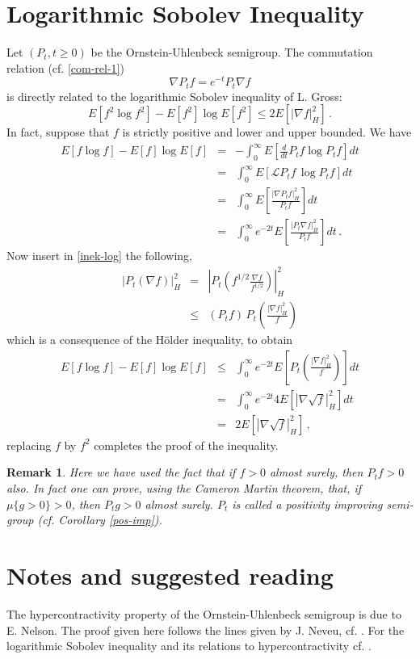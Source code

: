 \documentclass[12pt,a4paper]{book}
\newtheorem{remarkk}[theorem]{Remark}
\newcommand{\bea}{\begin{eqnarray}}
\newcommand{\eea}{\end{eqnarray}}
\newcommand{\beaa}{\begin{eqnarray*}}
\newcommand{\eeaa}{\end{eqnarray*}}
\renewcommand{\L}{{\mathcal L}}
\begin{document}
\section{Logarithmic Sobolev Inequality}
Let $(P_t,t\geq 0)$ be the Ornstein-Uhlenbeck semigroup. The
commutation relation (cf. \ref{com-rel-1}) 
$$
\nabla P_tf=e^{-t}P_t\nabla f
$$
is directly related to the logarithmic Sobolev inequality of L. Gross:
$$
E\left[f^2\log f^2\right]-E[f^2]\log E[f^2]\leq 2E\left[|\nabla
  f|_H^2\right]\,.
$$
In fact, suppose that $f$ is strictly  positive and lower and upper
bounded.  We have
\bea
\label{inek-log}
E[f\log f]-E[f]\log E[f]&=&-\int_0^\infty
 E\left[ \frac{d}{dt}P_tf\log P_tf\right]dt\nonumber\\
&=&\int_0^\infty E\left[\L P_tf\,\log P_tf\right]dt\nonumber\\
&=&\int_0^\infty E\left[\frac{|\nabla P_tf|_H^2}{ P_tf}\right]dt\nonumber\\
&=&\int_0^\infty e^{-2t}E\left[\frac{|P_t\nabla f|_H^2}{P_tf}\right]dt\,.
\eea
Now insert in \ref{inek-log}  the following,
\beaa
|P_t(\nabla f)|_H^2&=&\left|P_t\left(f^{1/2}\frac{\nabla
      f}{f^{1/2}}\right)\right |_H^2\\
&\leq& (P_tf)\,P_t\left(\frac{|\nabla f|_H^2}{f}\right)
\eeaa
which is a consequence of the H\"older  inequality, to obtain
\beaa
E[f\log f]-E[f]\log E[f]&\leq&\int_0^\infty
e^{-2t}E\left[P_t\left(\frac{|\nabla f|_H^2}{f}\right)\right]dt\\
&=&\int_0^\infty e^{-2t}4 E[|\nabla\sqrt{f}|_H^2]dt\\
&=&2E[|\nabla\sqrt{f}|_H^2]\,,
\eeaa
replacing $f$ by $f^2$ completes the proof of the inequality.

\begin{remarkk}{\rm
Here we have used the fact that if $f>0$ almost surely, then $P_tf>0$
also. In fact one can prove, using the Cameron Martin theorem, that, if
$\mu\{g>0\}>0$, then $P_tg>0$ almost surely. $P_t$ is called a
 positivity improving semi-group (cf. Corollary \ref{pos-imp}).
}
\end{remarkk}

\section*{Notes and suggested reading}
{\footnotesize{The hypercontractivity property of the
    Ornstein-Uhlenbeck semigroup is due to E. Nelson. The proof given
    here follows the lines given by  J. Neveu, cf. \cite{JN}. For the
    logarithmic Sobolev  inequality and its relations to
    hypercontractivity  cf. \cite{LG,LG-1,G1,G2}.


}}
\end{document}
